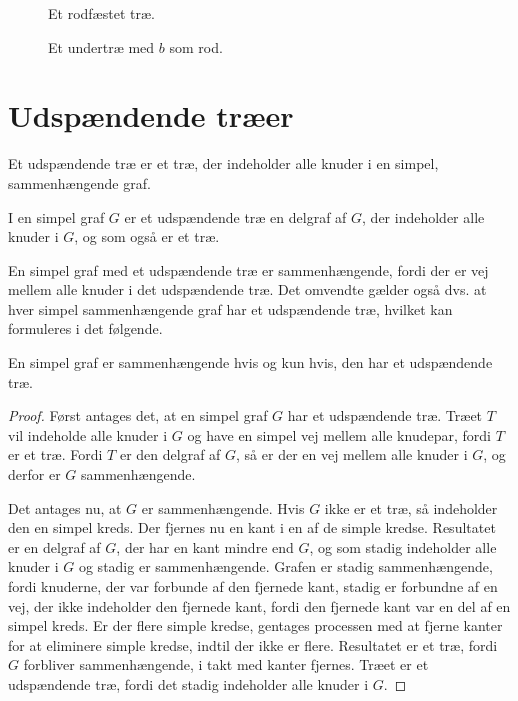 \begin{figure}[h]
\centering

\caption{Et rodfæstet træ.} 
\label{eksempel_rootedtree}
\end{figure}

\begin{figure}[h]
\centering

\caption{Et undertræ med $b$ som rod.} 
\label{eksempel_rootedsubtree}
\end{figure}

\section{Udspændende træer}

Et udspændende træ er et træ, der indeholder alle knuder i en simpel, sammenhængende graf.

\begin{defn}
I en simpel graf $G$ er et udspændende træ en delgraf af $G$, der indeholder alle knuder i $G$, og som også er et træ.
\end{defn}

En simpel graf med et udspændende træ er sammenhængende, fordi der er vej mellem alle knuder i det udspændende træ.
Det omvendte gælder også dvs. at hver simpel sammenhængende graf har et udspændende træ, hvilket kan formuleres i det følgende.

\begin{thm}
En simpel graf er sammenhængende hvis og kun hvis, den har et udspændende træ.
\end{thm}

\begin{proof}
Først antages det, at en simpel graf $G$ har et udspændende træ. 
Træet $T$ vil indeholde alle knuder i $G$ og have en simpel vej mellem alle knudepar, fordi $T$ er et træ. 
Fordi $T$ er den delgraf af $G$, så er der en vej mellem alle knuder i $G$, og derfor er $G$ sammenhængende.

Det antages nu, at $G$ er sammenhængende. Hvis $G$ ikke er et træ, så indeholder den en simpel kreds. 
Der fjernes nu en kant i en af de simple kredse. 
Resultatet er en delgraf af $G$, der har en kant mindre end $G$, og som stadig indeholder alle knuder i $G$ og stadig er sammenhængende. 
Grafen er stadig sammenhængende, fordi knuderne, der var forbunde af den fjernede kant, stadig er forbundne af en vej, der ikke indeholder den fjernede kant, fordi den fjernede kant var en del af en simpel kreds. 
Er der flere simple kredse, gentages processen med at fjerne kanter for at eliminere simple kredse, indtil der ikke er flere. 
Resultatet er et træ, fordi $G$ forbliver sammenhængende, i takt med kanter fjernes. Træet er et udspændende træ, fordi det stadig indeholder alle knuder i $G$.
\end{proof}

